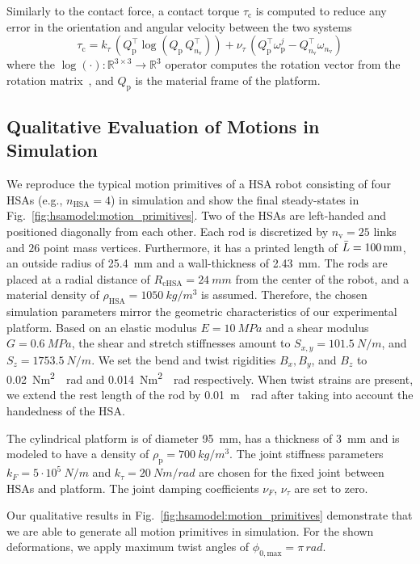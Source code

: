 Similarly to the contact force, a contact torque $\tau_\mathrm{c}$ is computed to reduce any error in the orientation and angular velocity between the two systems
\begin{equation}
    \tau_\mathrm{c} = k_\tau \, (Q_\mathrm{p}^\top \log(Q_\mathrm{p} \, Q_{n_\mathrm{v}}^\top)) + \nu_\tau \, (Q_\mathrm{p}^\top \omega_\mathrm{p}^j - Q_{n_\mathrm{v}}^\top \omega_{n_\mathrm{v}})
\end{equation}
where the $\log(\cdot): \mathbb{R}^{3 \times 3} \rightarrow \mathbb{R}^3$ operator computes the rotation vector from the rotation matrix~\citep{gazzola2018forward}, and $Q_\mathrm{p}$ is the material frame of the platform.

\subsection{Qualitative Evaluation of Motions in Simulation}\label{sub:hsamodel:hsa_robot_simulation:motion_primitives}
We reproduce the typical motion primitives of a \gls{HSA} robot consisting of four \glspl{HSA} (e.g., $n_\mathrm{HSA} = 4$) in simulation and show the final steady-states in Fig.~\ref{fig:hsamodel:motion_primitives}. Two of the \glspl{HSA} are left-handed and positioned diagonally from each other. 
Each rod is discretized by $n_\mathrm{v} = 25$ links and $26$ point mass vertices. Furthermore, it has a printed length of $\Bar{L} = \SI{100}{mm}$, an outside radius of \SI{25.4}{mm} and a wall-thickness of \SI{2.43}{mm}. The rods are placed at a radial distance of $R_\mathrm{cHSA} = \SI{24}{mm}$ from the center of the robot, and a material density of $\rho_\mathrm{HSA} = \SI{1050}{kg \per m^3}$ is assumed. Therefore, the chosen simulation parameters mirror the geometric characteristics of our experimental platform.
Based on an elastic modulus $E=\SI{10}{MPa}$ and a shear modulus $G=\SI{0.6}{MPa}$, the shear and stretch stiffnesses amount to $S_{x,y} = \SI{101.5}{N \per m}$, and $S_z = \SI{1753.5}{N \per m}$.
We set the bend and twist rigidities $B_{x}, B_y$, and $B_z$ to \SI{0.02}{Nm^2 \per rad} and \SI{0.014}{Nm^2 \per rad} respectively. When twist strains are present, we extend the rest length of the rod by \SI{0.01}{m \per rad} after taking into account the handedness of the \gls{HSA}.

The cylindrical platform is of diameter \SI{95}{mm}, has a thickness of \SI{3}{mm} and is modeled to have a density of $\rho_\mathrm{p} = \SI{700}{kg / m^3}$.
The joint stiffness parameters $k_F = 5\cdot 10^5 \: \si{N \per m}$ and $k_\tau = 20 \: \si{Nm \per rad}$ are chosen for the fixed joint between \glspl{HSA} and platform. The joint damping coefficients $\nu_F$, $\nu_\tau$ are set to zero.

Our qualitative results in Fig.~\ref{fig:hsamodel:motion_primitives} demonstrate that we are able to generate all motion primitives in simulation. For the shown deformations, we apply maximum twist angles of $\phi_{0,\mathrm{max}} = \pi \, \si{rad}$. %